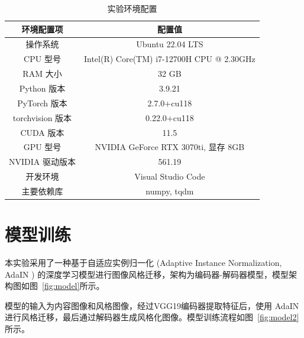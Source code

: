 \documentclass[UTF8,openany]{ctexbook}
\begin{document}
\begin{table}[H]
    \centering
    \caption{实验环境配置}
    \label{tab:env}
    \begin{tabular}{cc}
        \toprule
        环境配置项 & 配置值 \\ \midrule
        操作系统 & Ubuntu 22.04 LTS \\
        CPU 型号 & Intel(R) Core(TM) i7-12700H CPU @ 2.30GHz \\
        RAM 大小 & 32 GB \\
        Python 版本 & 3.9.21 \\
        PyTorch 版本 & 2.7.0+cu118 \\
        torchvision 版本 & 0.22.0+cu118 \\
        CUDA 版本 & 11.5 \\
        GPU 型号 & NVIDIA GeForce RTX 3070ti, 显存 8GB \\
        NVIDIA 驱动版本 & 561.19 \\ 
        开发环境 & Visual Studio Code \\ 
        主要依赖库 & numpy, tqdm \\ \bottomrule
    \end{tabular}
\end{table}

\section{模型训练}
\label{sec:model}

本实验采用了一种基于自适应实例归一化 (Adaptive Instance Normalization, AdaIN \cite{huang2017arbitrary}) 的深度学习模型进行图像风格迁移，架构为编码器-解码器模型，模型架构图如图~\ref{fig:model}所示。

模型的输入为内容图像和风格图像，经过VGG19编码器提取特征后，使用 AdaIN 进行风格迁移，最后通过解码器生成风格化图像。模型训练流程如图~\ref{fig:model2}所示。
\end{document}
